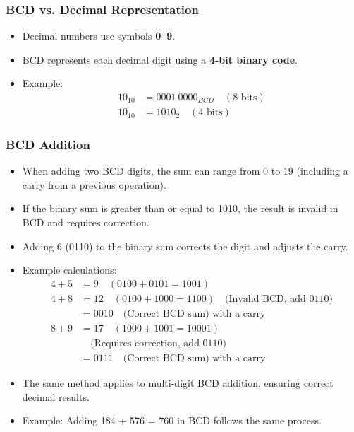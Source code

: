 \documentclass[a4paper,12pt]{article}
\begin{document}
\subsubsection{BCD vs. Decimal Representation}
\begin{itemize}
    \item Decimal numbers use symbols \textbf{0--9}.
    \item BCD represents each decimal digit using a \textbf{4-bit binary code}.
    \item Example:
    \begin{align*}
        10_{10} &= 0001\ 0000_{BCD} \quad (8\text{ bits})\\
        10_{10} &= 1010_2 \quad (4\text{ bits})
    \end{align*}
\end{itemize}
\subsubsection{BCD Addition}
\begin{itemize}
    \item When adding two BCD digits, the sum can range from 0 to 19 (including a carry from a previous operation).
    \item If the binary sum is greater than or equal to 1010, the result is invalid in BCD and requires correction.
    \item Adding 6 (0110) to the binary sum corrects the digit and adjusts the carry.
    \item Example calculations:
    \begin{align*}
        4 + 5 &= 9 \quad (0100 + 0101 = 1001)\\
        4 + 8 &= 12 \quad (0100 + 1000 = 1100) \quad \text{(Invalid BCD, add 0110)}\\
              &= 0010 \quad \text{(Correct BCD sum) with a carry}\\
        8 + 9 &= 17 \quad (1000 + 1001 = 10001)\\
              &\quad \text{(Requires correction, add 0110)}\\
              &= 0111 \quad \text{(Correct BCD sum) with a carry}
    \end{align*}
    \item The same method applies to multi-digit BCD addition, ensuring correct decimal results.
    \item Example: Adding 184 + 576 = 760 in BCD follows the same process.
\end{itemize}
\end{document}
